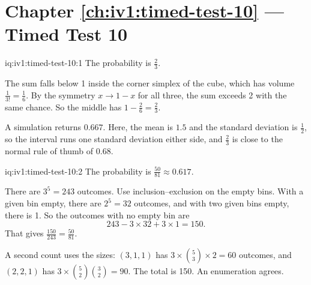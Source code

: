 \section*{Chapter \ref{ch:iv1:timed-test-10} --- Timed Test 10}

\begin{solution}{iq:iv1:timed-test-10:1}
The probability is $\frac23$.

The sum falls below 1 inside the corner simplex of the cube, which has volume $\frac{1}{3!} = \frac16$. By the symmetry $x \to 1 - x$ for all three, the sum exceeds 2 with the same chance. So the middle has $1 - \frac26 = \frac23$.

A simulation returns $0.667$. Here, the mean is $1.5$ and the standard deviation is $\frac12$, so the interval runs one standard deviation either side, and $\frac23$ is close to the normal rule of thumb of $0.68$.

\end{solution}

\begin{solution}{iq:iv1:timed-test-10:2}
The probability is $\frac{50}{81} \approx 0.617$.

There are $3^5 = 243$ outcomes. Use inclusion--exclusion on the empty bins. With a given bin empty, there are $2^5 = 32$ outcomes, and with two given bins empty, there is 1. So the outcomes with no empty bin are
\[
243 - 3 \times 32 + 3 \times 1 = 150.
\]
That gives $\frac{150}{243} = \frac{50}{81}$.

A second count uses the sizes: $(3, 1, 1)$ has $3 \times \binom53 \times 2 = 60$ outcomes, and $(2, 2, 1)$ has $3 \times \binom52\binom32 = 90$. The total is 150. An enumeration agrees.

\end{solution}

